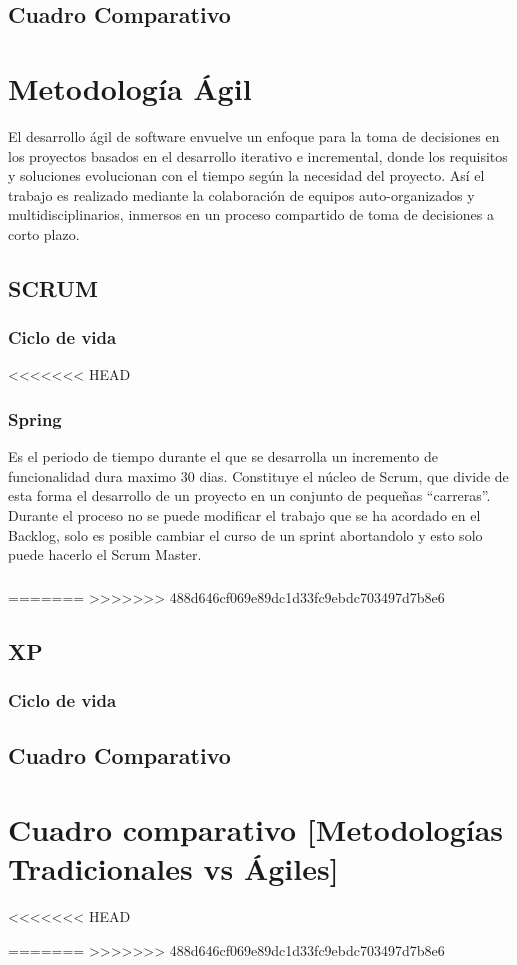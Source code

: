 \subsection{Cuadro Comparativo}

\section{Metodología Ágil} 

El desarrollo ágil de software envuelve un enfoque para la toma de decisiones en los proyectos basados en el desarrollo iterativo e incremental, donde los requisitos y soluciones evolucionan con el tiempo según la necesidad del proyecto. Así el trabajo es realizado mediante la colaboración de equipos auto-organizados y multidisciplinarios, inmersos en un proceso compartido de toma de decisiones a corto plazo.

\subsection{SCRUM}
\subsubsection{Ciclo de vida}
<<<<<<< HEAD


\subsubsection{Spring}
\setlength{\parskip}{5mm}

	Es el periodo de tiempo durante el que se desarrolla un incremento de funcionalidad dura maximo 30 dias. Constituye el núcleo de Scrum, que divide de esta forma el desarrollo de un proyecto en un conjunto de pequeñas “carreras”. Durante el proceso no se puede modificar el trabajo que se ha acordado en el Backlog, solo es posible cambiar el curso de un sprint abortandolo y esto solo puede hacerlo el Scrum Master. 
	
\setlength{\parskip}{0mm}

\subsubsection{}
    

=======
>>>>>>> 488d646cf069e89dc1d33fc9ebdc703497d7b8e6
\subsection{XP}
\subsubsection{Ciclo de vida}
\subsection{}
\subsection{Cuadro Comparativo}

\section{Cuadro comparativo [Metodologías Tradicionales vs Ágiles]} 
<<<<<<< HEAD

=======
>>>>>>> 488d646cf069e89dc1d33fc9ebdc703497d7b8e6
